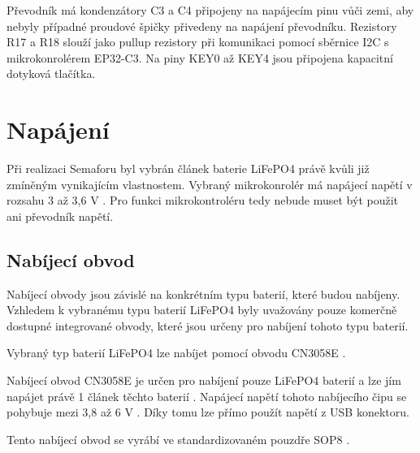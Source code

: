 Převodník má kondenzátory C3 a C4 připojeny na napájecím pinu vůči zemi, aby nebyly případné proudové špičky přivedeny na napájení převodníku. Rezistory
R17 a R18 slouží jako pullup rezistory při komunikaci pomocí sběrnice I2C s mikrokonrolérem EP32-C3. Na piny KEY0 až KEY4 jsou připojena kapacitní 
dotyková tlačítka.  

\section{Napájení}
Při realizaci Semaforu byl vybrán článek baterie LiFePO4 právě kvůli již zmíněným vynikajícím vlastnostem. Vybraný mikrokonrolér má napájecí napětí v rozsahu 3 až 3,6 V \cite{ESP_C3_dtsh}. 
Pro funkci mikrokontroléru tedy nebude muset být použit ani převodník napětí.  


\subsection{Nabíjecí obvod}
Nabíjecí obvody jsou závislé na konkrétním typu baterií, které budou nabíjeny. Vzhledem k vybranému typu baterií LiFePO4 byly uvažovány pouze komerčně
dostupné integrované obvody, které jsou určeny pro nabíjení tohoto typu baterií. 

Vybraný typ baterií LiFePO4 lze nabíjet pomocí obvodu CN3058E \cite{charger_dtsh}. 


Nabíjecí obvod CN3058E je určen pro nabíjení pouze LiFePO4 baterií a lze jím napájet právě 1 článek těchto baterií \cite{charger_dtsh}. Napájecí napětí tohoto 
nabíjecího čipu se pohybuje mezi 3,8 až 6 V \cite{charger_dtsh}. Díky tomu lze přímo použít napětí z USB konektoru. 



Tento nabíjecí obvod se vyrábí ve standardizovaném pouzdře SOP8 \cite{charger_dtsh}.

